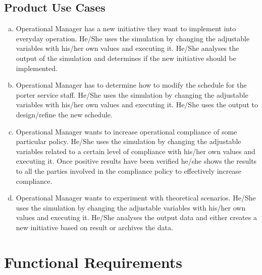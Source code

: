 \documentclass[paper=letter, fontsize=10pt]{scrartcl}
\numberwithin{equation}{section}		%
\numberwithin{figure}{section}			%
\numberwithin{table}{section}				%
\begin{document}
\subsection{Product Use Cases}
\begin{enumerate}[(a)]
	\item Operational Manager has a new initiative they want to implement into everyday operation. He/She uses the simulation by changing the adjustable variables with his/her own values and executing it. He/She analyses the output of the simulation and determines if the new initiative should be implemented.
	\item Operational Manager has to determine how to modify the schedule for the porter service staff. He/She uses the simulation by changing the adjustable variables with his/her own values and executing it. He/She uses the output to design/refine the new schedule.
	\item Operational Manager wants to increase operational compliance of some particular policy. He/She uses the simulation by changing the adjustable variables related to a certain level of compliance with his/her own values and executing it. Once positive results have been verified he/she shows the results to all the parties involved in the compliance policy to effectively increase compliance.
	\item Operational Manager wants to experiment with theoretical scenarios. He/She uses the simulation by changing the adjustable variables with his/her own values and executing it. He/She analyses the output data and either creates a new initiative based on result or archives the data.
	     
\end{enumerate}

\section{Functional Requirements}
\end{document}
